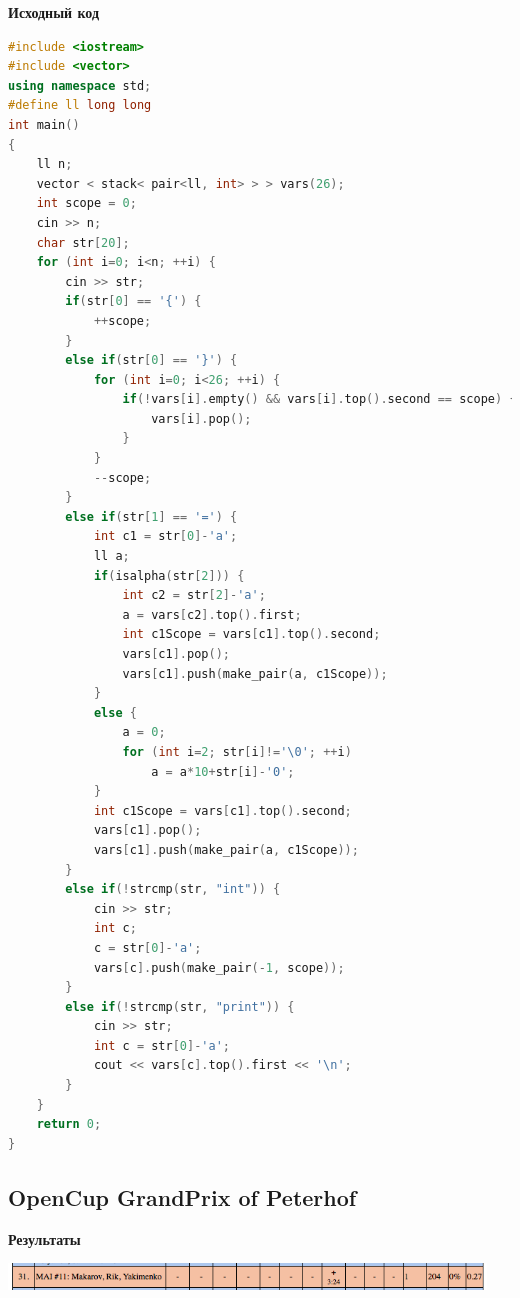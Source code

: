\documentclass[a4paper,12pt]{article}
\begin{document}
\newpage
\textbf{{\large Исходный код}} \\
\begin{lstlisting}[language=C++]
#include <iostream>
#include <vector>
using namespace std;
#define ll long long
int main()
{
    ll n;
    vector < stack< pair<ll, int> > > vars(26);
    int scope = 0;
    cin >> n;
    char str[20];
    for (int i=0; i<n; ++i) {
        cin >> str;
        if(str[0] == '{') {
            ++scope;
        }
        else if(str[0] == '}') {
            for (int i=0; i<26; ++i) {
                if(!vars[i].empty() && vars[i].top().second == scope) {
                    vars[i].pop();
                }
            }
            --scope;
        }
        else if(str[1] == '=') {
            int c1 = str[0]-'a';
            ll a;
            if(isalpha(str[2])) {
                int c2 = str[2]-'a';
                a = vars[c2].top().first;
                int c1Scope = vars[c1].top().second;
                vars[c1].pop();
                vars[c1].push(make_pair(a, c1Scope));
            }
            else {
                a = 0;
                for (int i=2; str[i]!='\0'; ++i)
                    a = a*10+str[i]-'0';
            }
            int c1Scope = vars[c1].top().second;
            vars[c1].pop();
            vars[c1].push(make_pair(a, c1Scope));
        }
        else if(!strcmp(str, "int")) {
            cin >> str;
            int c;
            c = str[0]-'a';
            vars[c].push(make_pair(-1, scope));
        }
        else if(!strcmp(str, "print")) {
            cin >> str;
            int c = str[0]-'a';
            cout << vars[c].top().first << '\n';
        }
    }
    return 0;
}
\end{lstlisting}



%
%
\newpage
\subsection{OpenCup GrandPrix of Peterhof}

\textbf{{\large Результаты}} \\
\begin{center}
\includegraphics[width=0.95\textwidth]{OC_Peterhof/OC_Peterhof_result.png}\\ [1cm]
\end{center}
\end{document}
